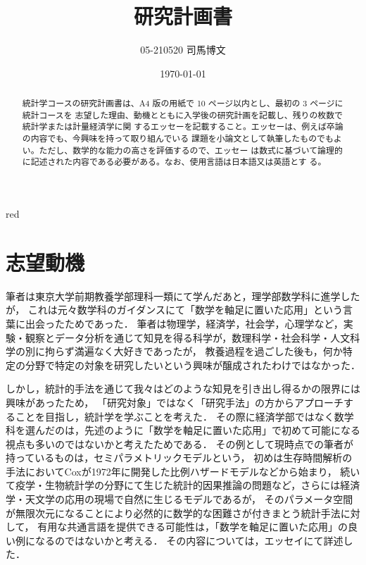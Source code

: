 \documentclass[uplatex, dvipdfmx]{jsarticle}
\title{研究計画書}
\author{05-210520 司馬博文}
\date{\today}
\begin{document}
\begin{tbox}{red}{}
    \begin{abstract}
        統計学コースの研究計画書は、A4 版の用紙で 10 ページ以内とし、最初の 3 ページに統計コースを
        志望した理由、動機とともに入学後の研究計画を記載し、残りの枚数で統計学または計量経済学に関
        するエッセーを記載すること。エッセーは、例えば卒論の内容でも、今興味を持って取り組んでいる
        課題を小論文として執筆したものでもよい。ただし、数学的な能力の高さを評価するので、エッセー
        は数式に基づいて論理的に記述された内容である必要がある。なお、使用言語は日本語又は英語とす
        る。
    \end{abstract}
\end{tbox}


\section*{志望動機}


筆者は東京大学前期教養学部理科一類にて学んだあと，理学部数学科に進学したが，
これは元々数学科のガイダンスにて「数学を軸足に置いた応用」という言葉に出会ったためであった．
筆者は物理学，経済学，社会学，心理学など，実験・観察とデータ分析を通じて知見を得る科学が，数理科学・社会科学・人文科学の別に拘らず満遍なく大好きであったが，
教養過程を過ごした後も，何か特定の分野で特定の対象を研究したいという興味が醸成されたわけではなかった．

しかし，統計的手法を通じて我々はどのような知見を引き出し得るかの限界には興味があったため，
「研究対象」ではなく「研究手法」の方からアプローチすることを目指し，統計学を学ぶことを考えた．
その際に経済学部ではなく数学科を選んだのは，先述のように「数学を軸足に置いた応用」で初めて可能になる視点も多いのではないかと考えたためである．
その例として現時点での筆者が持っているものは，セミパラメトリックモデルという，
初めは生存時間解析の手法においてCoxが1972年に開発した比例ハザードモデルなどから始まり，
続いて疫学・生物統計学の分野にて生じた統計的因果推論の問題など，さらには経済学・天文学の応用の現場で自然に生じるモデルであるが，
そのパラメータ空間が無限次元になることにより必然的に数学的な困難さが付きまとう統計手法に対して，
有用な共通言語を提供できる可能性は，「数学を軸足に置いた応用」の良い例になるのではないかと考える．
その内容については，エッセイにて詳述した．
\end{document}
